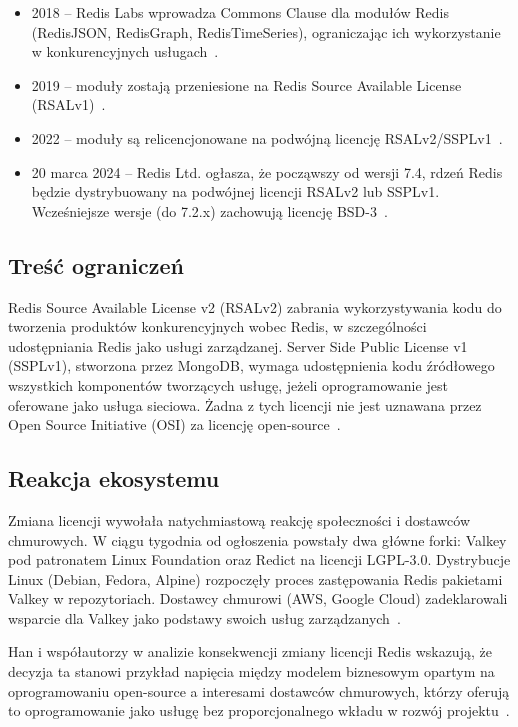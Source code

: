 \begin{itemize}
    \item 2018 -- Redis Labs wprowadza Commons Clause dla modułów Redis (RedisJSON, RedisGraph, RedisTimeSeries), ograniczając ich wykorzystanie w konkurencyjnych usługach~\cite{whitacreRelicensing}.
    \item 2019 -- moduły zostają przeniesione na Redis Source Available License (RSALv1)~\cite{whitacreRelicensing}.
    \item 2022 -- moduły są relicencjonowane na podwójną licencję RSALv2/SSPLv1~\cite{redisLicenseChange}.
    \item 20 marca 2024 -- Redis Ltd. ogłasza, że począwszy od wersji 7.4, rdzeń Redis będzie dystrybuowany na podwójnej licencji RSALv2 lub SSPLv1. Wcześniejsze wersje (do 7.2.x) zachowują licencję BSD-3~\cite{redisLicenseChange}.
\end{itemize}

\subsection{Treść ograniczeń}

Redis Source Available License v2 (RSALv2) zabrania wykorzystywania kodu do tworzenia produktów konkurencyjnych wobec Redis, w szczególności udostępniania Redis jako usługi zarządzanej. Server Side Public License v1 (SSPLv1), stworzona przez MongoDB, wymaga udostępnienia kodu źródłowego wszystkich komponentów tworzących usługę, jeżeli oprogramowanie jest oferowane jako usługa sieciowa. Żadna z tych licencji nie jest uznawana przez Open Source Initiative (OSI) za licencję open-source~\cite{han2026}.

\subsection{Reakcja ekosystemu}

Zmiana licencji wywołała natychmiastową reakcję społeczności i dostawców chmurowych. W ciągu tygodnia od ogłoszenia powstały dwa główne forki: Valkey pod patronatem Linux Foundation oraz Redict na licencji LGPL-3.0. Dystrybucje Linux (Debian, Fedora, Alpine) rozpoczęły proces zastępowania Redis pakietami Valkey w repozytoriach. Dostawcy chmurowi (AWS, Google Cloud) zadeklarowali wsparcie dla Valkey jako podstawy swoich usług zarządzanych~\cite{han2026}.

Han i współautorzy w analizie konsekwencji zmiany licencji Redis wskazują, że decyzja ta stanowi przykład napięcia między modelem biznesowym opartym na oprogramowaniu open-source a interesami dostawców chmurowych, którzy oferują to oprogramowanie jako usługę bez proporcjonalnego wkładu w rozwój projektu~\cite{han2026}.

